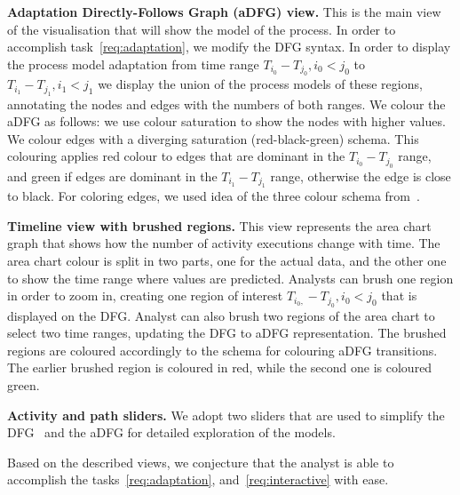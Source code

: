 \textbf{Adaptation Directly-Follows Graph (aDFG) view.} This is the main view of the visualisation that will show the model of the process. In order to accomplish task~\ref{req:adaptation}, we modify the DFG syntax. In order to display the process model adaptation from time range $T_{i_0}-T_{j_0}, i_0<j_0$ to $T_{i_1}-T_{j_1}, i_1<j_1$ we display the union of the process models of these regions, annotating the nodes and edges with the numbers of both ranges. We colour the aDFG as follows: we use colour saturation to show the nodes with higher values. We colour edges with a diverging saturation (red-black-green) schema. This colouring applies red colour to edges that are dominant in the $T_{i_0}-T_{j_0}$ range, and green if edges are dominant in the $T_{i_1}-T_{j_1}$ range, otherwise the edge is close to black. For coloring edges, we used idea of the three colour schema from~\cite{DBLP:conf/grapp/KriglsteinR12}.

\textbf{Timeline view with brushed regions.} This view represents the area chart graph that shows how the number of activity executions change with time. The area chart colour is split in two parts, one for the actual data, and the other one to show the time range where values are predicted. Analysts can brush one region in order to zoom in, creating one region of interest $T_{i_0,}-T_{j_0}, i_0<j_0$ that is displayed on the DFG. Analyst can also brush two regions of the area chart to select two time ranges, updating the DFG to aDFG representation. The brushed regions are coloured accordingly to the schema for colouring aDFG transitions. The earlier brushed region is coloured in red, while the second one is coloured green. 

\textbf{Activity and path sliders.} We adopt two sliders that are used to simplify the DFG~\cite{leemans2019directly} and the aDFG for detailed exploration of the models.

Based on the described views, we conjecture that the analyst is able to accomplish the tasks~\ref{req:adaptation}, and~\ref{req:interactive} with ease.







